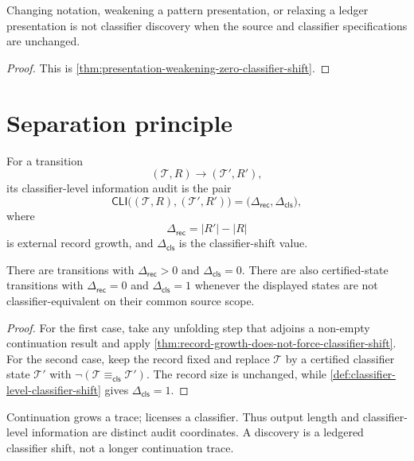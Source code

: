 \begin{corollary}
\label{cor:renaming-is-not-classifier-discovery}
Changing notation, weakening a pattern presentation, or relaxing a ledger
presentation is not classifier discovery when the source and classifier
specifications are unchanged.
\end{corollary}
\begin{proof}
This is \autoref{thm:presentation-weakening-zero-classifier-shift}.
\end{proof}

\section{Separation principle}
\label{sec:classifier-level-information-separation}

\begin{definition}
\label{def:classifier-level-information}
For a transition
$$
(\mathcal T,R)\longrightarrow(\mathcal T',R'),
$$
its classifier-level information audit is the pair
$$
\mathsf{CLI}\bigl((\mathcal T,R),(\mathcal T',R')\bigr)
=
\bigl(\Delta_{\mathsf{rec}},\Delta_{\mathsf{cls}}\bigr),
$$
where
$$
\Delta_{\mathsf{rec}}=|R'|-|R|
$$
is external record growth, and $\Delta_{\mathsf{cls}}$ is the
classifier-shift value.
\end{definition}

\begin{theorem}
\label{thm:record-growth-classifier-shift-independent}
There are transitions with $\Delta_{\mathsf{rec}}>0$ and
$\Delta_{\mathsf{cls}}=0$. There are also certified-state transitions with
$\Delta_{\mathsf{rec}}=0$ and $\Delta_{\mathsf{cls}}=1$ whenever the displayed
states are not classifier-equivalent on their common source scope.
\end{theorem}
\begin{proof}
For the first case, take any unfolding step that adjoins a non-empty
continuation result and apply
\autoref{thm:record-growth-does-not-force-classifier-shift}. For the second
case, keep the record fixed and replace $\mathcal T$ by a certified classifier
state $\mathcal T'$ with
$\neg(\mathcal T\equiv_{\mathsf{cls}}\mathcal T')$. The record size is
unchanged, while \autoref{def:classifier-level-classifier-shift} gives
$\Delta_{\mathsf{cls}}=1$.
\end{proof}

\begin{principle}
\label{prin:computation-extends-records-discovery-changes-classifiers}
Continuation grows a trace; \NameCert{} licenses a classifier. Thus output
length and classifier-level information are distinct audit coordinates. A
discovery is a ledgered classifier shift, not a longer continuation trace.
\end{principle}

